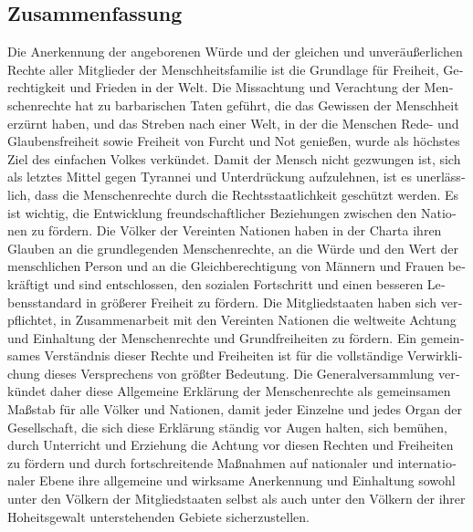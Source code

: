 \documentclass[
  titlepage,
  openright,
  DIV=calc,
  toc=listof,
  listof=nochaptergap]{scrbook}
\begin{document}
\begin{otherlanguage}{german}
\chapter*{Zusammenfassung}
\begin{spacing}{1.5}
Die Anerkennung der angeborenen Würde und der gleichen und unveräußerlichen Rechte aller Mitglieder der Menschheitsfamilie ist die Grundlage für Freiheit, Gerechtigkeit und Frieden in der Welt. Die Missachtung und Verachtung der Menschenrechte hat zu barbarischen Taten geführt, die das Gewissen der Menschheit erzürnt haben, und das Streben nach einer Welt, in der die Menschen Rede- und Glaubensfreiheit sowie Freiheit von Furcht und Not genießen, wurde als höchstes Ziel des einfachen Volkes verkündet. Damit der Mensch nicht gezwungen ist, sich als letztes Mittel gegen Tyrannei und Unterdrückung aufzulehnen, ist es unerlässlich, dass die Menschenrechte durch die Rechtsstaatlichkeit geschützt werden. Es ist wichtig, die Entwicklung freundschaftlicher Beziehungen zwischen den Nationen zu fördern. Die Völker der Vereinten Nationen haben in der Charta ihren Glauben an die grundlegenden Menschenrechte, an die Würde und den Wert der menschlichen Person und an die Gleichberechtigung von Männern und Frauen bekräftigt und sind entschlossen, den sozialen Fortschritt und einen besseren Lebensstandard in größerer Freiheit zu fördern. Die Mitgliedstaaten haben sich verpflichtet, in Zusammenarbeit mit den Vereinten Nationen die weltweite Achtung und Einhaltung der Menschenrechte und Grundfreiheiten zu fördern. Ein gemeinsames Verständnis dieser Rechte und Freiheiten ist für die vollständige Verwirklichung dieses Versprechens von größter Bedeutung. Die Generalversammlung verkündet daher diese Allgemeine Erklärung der Menschenrechte als gemeinsamen Maßstab für alle Völker und Nationen, damit jeder Einzelne und jedes Organ der Gesellschaft, die sich diese Erklärung ständig vor Augen halten, sich bemühen, durch Unterricht und Erziehung die Achtung vor diesen Rechten und Freiheiten zu fördern und durch fortschreitende Maßnahmen auf nationaler und internationaler Ebene ihre allgemeine und wirksame Anerkennung und Einhaltung sowohl unter den Völkern der Mitgliedstaaten selbst als auch unter den Völkern der ihrer Hoheitsgewalt unterstehenden Gebiete sicherzustellen.
\end{spacing}
\end{otherlanguage}

\renewcommand*\contentsname{Contents}
{
\hypersetup{linkcolor=}
\setcounter{tocdepth}{2}
\tableofcontents
}
\mainmatter
\end{document}
